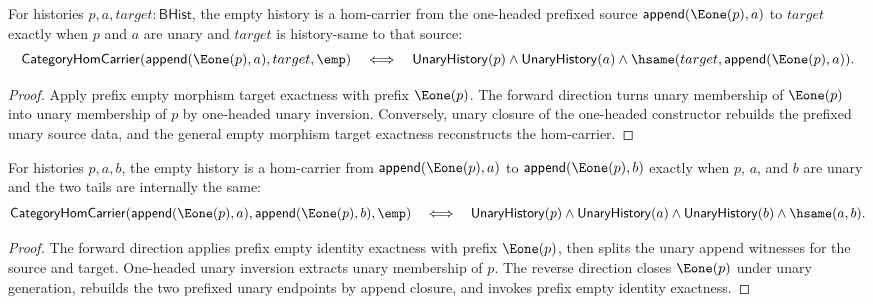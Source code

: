 \begin{theorem}
\label{thm:functor-prefix-hom-carrier-e1-prefix-empty-morphism-target}
For histories $p,a,target:\mathsf{BHist}$, the empty history is a hom-carrier
from the one-headed prefixed source $\mathsf{append}(\Eone(p),a)$ to $target$
exactly when $p$ and $a$ are unary and $target$ is history-same to that source:
$$
\mathsf{CategoryHomCarrier}(\mathsf{append}(\Eone(p),a),target,\emp)
\quad\Longleftrightarrow\quad
\mathsf{UnaryHistory}(p)\wedge\mathsf{UnaryHistory}(a)\wedge
\hsame(target,\mathsf{append}(\Eone(p),a)).
$$
\end{theorem}
\begin{proof}
Apply prefix empty morphism target exactness with prefix $\Eone(p)$. The
forward direction turns unary membership of $\Eone(p)$ into unary membership
of $p$ by one-headed unary inversion. Conversely, unary closure of the
one-headed constructor rebuilds the prefixed unary source data, and the
general empty morphism target exactness reconstructs the hom-carrier.
\end{proof}

\begin{theorem}
\label{thm:functor-prefix-hom-carrier-e1-prefix-empty-identity-iff}
For histories \(p,a,b\), the empty history is a hom-carrier from
\(\mathsf{append}(\Eone(p),a)\) to \(\mathsf{append}(\Eone(p),b)\) exactly
when \(p\), \(a\), and \(b\) are unary and the two tails are internally the
same:
$$
\mathsf{CategoryHomCarrier}(\mathsf{append}(\Eone(p),a),
\mathsf{append}(\Eone(p),b),\emp)
\quad\Longleftrightarrow\quad
\mathsf{UnaryHistory}(p)\wedge\mathsf{UnaryHistory}(a)\wedge
\mathsf{UnaryHistory}(b)\wedge\hsame(a,b).
$$
\end{theorem}
\begin{proof}
The forward direction applies prefix empty identity exactness with prefix
\(\Eone(p)\), then splits the unary append witnesses for the source and
target. One-headed unary inversion extracts unary membership of \(p\). The
reverse direction closes \(\Eone(p)\) under unary generation, rebuilds the two
prefixed unary endpoints by append closure, and invokes prefix empty identity
exactness.
\end{proof}

